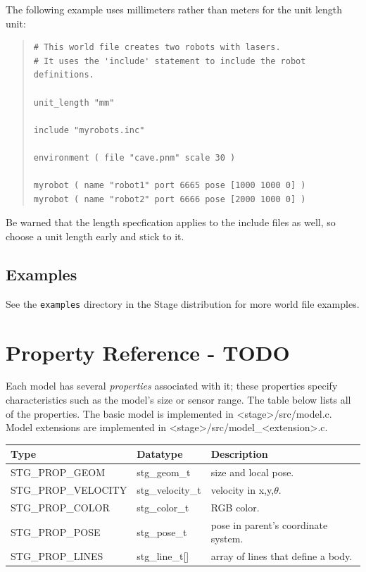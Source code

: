 \documentclass[letter,11pt,twoside]{report}
\begin{document}
\noindent The following example uses millimeters rather than meters
for the unit length unit:
\begin{quote}
\begin{verbatim}
# This world file creates two robots with lasers.
# It uses the 'include' statement to include the robot definitions.

unit_length "mm"

include "myrobots.inc"

environment ( file "cave.pnm" scale 30 )

myrobot ( name "robot1" port 6665 pose [1000 1000 0] )
myrobot ( name "robot2" port 6666 pose [2000 1000 0] )
\end{verbatim}
\end{quote}
Be warned that the length specfication applies to the include files as well,
so choose a unit length early and stick to it.


\section{Examples}

See the {\tt examples} directory in the Stage distribution for more
world file examples.


\chapter{Property Reference - TODO}


Each model has several {\em properties} associated with it; these
properties specify characteristics such as the model's size or sensor
range. The table below lists all of the properties.  The basic
model is implemented in <stage>/src/model.c. Model extensions are
implemented in <stage>/src/model\_<extension>.c.
\vspace{1em}\\
\noindent
\begin{tabularx}{\columnwidth}{lll}
\hline 
Type & Datatype & Description \\
\hline 
STG\_PROP\_GEOM & stg\_geom\_t & size and local pose. \\ 
STG\_PROP\_VELOCITY & stg\_velocity\_t & velocity in x,y,$\theta$. \\
STG\_PROP\_COLOR & stg\_color\_t & RGB color. \\
STG\_PROP\_POSE & stg\_pose\_t & pose in parent's coordinate system. \\
STG\_PROP\_LINES & stg\_line\_t[] & array of lines that define a body. \\

\hline
\end{tabularx}
\end{document}
